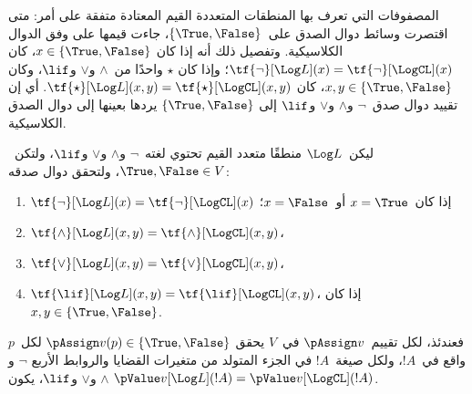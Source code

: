 \documentclass[../../../include/open-logic-section]{subfiles}
\begin{document}


المصفوفات التي تعرف بها المنطقات المتعددة القيم المعتادة متفقة على
أمر: متى اقتصرت وسائط دوال الصدق على~$\{\True, \False\}$، جاءت
قيمها على وفق الدوال الكلاسيكية. وتفصيل ذلك أنه إذا كان
$x \in \{\True, \False\}$، كان
$\tf{\lnot}[\Log L](x) = \tf{\lnot}[\LogCL](x)$؛ وإذا كان
$\star$ واحدًا من~$\land$ و$\lor$ و$\lif$، وكان
$x, y \in \{\True, \False\}$، كان
$\tf{\star}[\Log L](x,y) = \tf{\star}[\LogCL](x,y)$. أي إن تقييد
دوال صدق~$\lnot$ و$\land$ و$\lor$ و$\lif$ إلى
$\{\True,\False\}$ يردها بعينها إلى دوال الصدق الكلاسيكية.

\begin{prop}
  ليكن~$\Log L$ منطقًا متعدد القيم تحتوي لغته~$\lnot$ و$\land$
  و$\lor$ و$\lif$، ولتكن~$\True, \False \in V$، ولتحقق دوال صدقه:
  \begin{enumerate}
    \item{} $\tf{\lnot}[\Log L](x) = \tf{\lnot}[\LogCL](x)$ إذا كان~$x =
    \True$ أو~$x = \False$؛
    \item{} $\tf{\land}[\Log L](x,y) = \tf{\land}[\LogCL](x,y)$،
    \item{} $\tf{\lor}[\Log L](x,y) = \tf{\lor}[\LogCL](x,y)$،
    \item{} $\tf{\lif}[\Log L](x,y) = \tf{\lif}[\LogCL](x,y)$،
    إذا كان~$x, y \in \{\True, \False\}$.
  \end{enumerate}
  فعندئذ، لكل تقييم~$\pAssign v$ في~$V$ يحقق
  $\pAssign v(p) \in \{\True,\False\}$ لكل~$p$ واقع في~$!A$، ولكل
  صيغة~$!A$ في الجزء المتولد من متغيرات القضايا والروابط الأربع
  $\lnot$ و$\land$ و$\lor$ و$\lif$، يكون
  $\pValue v[\Log L](!A) = \pValue v[\LogCL](!A)$.
\end{prop}
\end{document}
